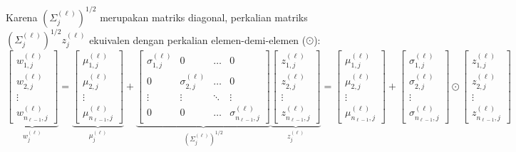 \documentclass[11pt,a4paper]{article}
\def\boldsymbol#1{#1}%
\def\mathbf#1{#1}%
\theoremstyle{plain}
\theoremstyle{definition}
\theoremstyle{remark}
\begin{document}
Karena $\left(\Sigma^{(\ell)}_j\right)^{1/2}$ merupakan matriks diagonal, perkalian matriks $\left(\Sigma^{(\ell)}_j\right)^{1/2} \mathbf{z}^{(\ell)}_j$ ekuivalen dengan perkalian elemen-demi-elemen ($\odot$):
\begin{equation}
    \underbrace{\begin{bmatrix} w^{(\ell)}_{1, j} \\ w^{(\ell)}_{2, j} \\ \vdots \\ w^{(\ell)}_{n_{\ell-1}, j} \end{bmatrix}}_{\mathbf{w}^{(\ell)}_j}
    =
    \underbrace{\begin{bmatrix} \mu^{(\ell)}_{1, j} \\ \mu^{(\ell)}_{2, j} \\ \vdots \\ \mu^{(\ell)}_{n_{\ell-1}, j} \end{bmatrix}}_{\boldsymbol{\mu}^{(\ell)}_j}
    +
    \underbrace{\begin{bmatrix}
        \sigma^{(\ell)}_{1, j} & 0 & \dots & 0 \\
        0 & \sigma^{(\ell)}_{2, j} & \dots & 0 \\
        \vdots & \vdots & \ddots & \vdots \\
        0 & 0 & \dots & \sigma^{(\ell)}_{n_{\ell-1}, j}
    \end{bmatrix}}_{\left(\Sigma^{(\ell)}_j\right)^{1/2}}
    \underbrace{\begin{bmatrix} z^{(\ell)}_{1, j} \\ z^{(\ell)}_{2, j} \\ \vdots \\ z^{(\ell)}_{n_{\ell-1}, j} \end{bmatrix}}_{\mathbf{z}^{(\ell)}_j}
    =
    \begin{bmatrix} \mu^{(\ell)}_{1, j} \\ \mu^{(\ell)}_{2, j} \\ \vdots \\ \mu^{(\ell)}_{n_{\ell-1}, j} \end{bmatrix}
    +
    \begin{bmatrix} \sigma^{(\ell)}_{1, j} \\ \sigma^{(\ell)}_{2, j} \\ \vdots \\ \sigma^{(\ell)}_{n_{\ell-1}, j} \end{bmatrix}
    \odot
    \begin{bmatrix} z^{(\ell)}_{1, j} \\ z^{(\ell)}_{2, j} \\ \vdots \\ z^{(\ell)}_{n_{\ell-1}, j} \end{bmatrix} \label{eq:diag_to_hadamard}
\end{equation}
\end{document}
